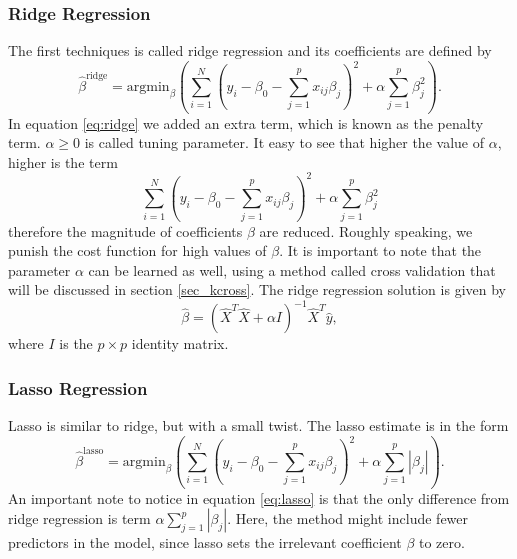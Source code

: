 \documentclass [11pt]{article}
\begin{document}
\subsubsection*{Ridge Regression}
The first techniques is called ridge regression and its coefficients are defined by 
\begin{equation}
\hat{\beta}^{\text{ridge}}=\text{argmin}_{\beta} ( \sum_{i=1}^{N}(y_{i}- \beta_{0}- \sum_{j=1}^{p}x_{ij}\beta_{j})^{2}+ \alpha \sum_{j=1}^{p} \beta_{j}^{2}).
\label{eq:ridge}
\end{equation}
In equation \eqref{eq:ridge} we added an extra term, which is known as the penalty term. $\alpha \geq 0$ is called tuning parameter. It easy to see that higher the value of $\alpha$, higher is the term 
\begin{equation*}
\sum_{i=1}^{N}(y_{i}- \beta_{0}- \sum_{j=1}^{p}x_{ij}\beta_{j})^{2}+ \alpha \sum_{j=1}^{p} \beta_{j}^{2}
\end{equation*}
therefore the magnitude of coefficients $\beta$ are reduced. Roughly speaking, we punish the cost function for high values of $\beta$. It is important to note that the parameter $\alpha$ can be learned as well, using a method called cross validation that will be discussed in section \ref{sec_kcross}.
The ridge regression solution is given by
\begin{equation}
\hat{\beta} =\left(\hat{X}^T\hat{X} + \alpha I \right)^{-1}\hat{X}^T\hat{y},
\end{equation}
where $I$ is the $p \times p$ identity matrix.
\subsubsection*{Lasso Regression}
Lasso is similar to ridge, but with a small twist. The lasso estimate is in the form
\begin{equation}
\hat{\beta}^{\text{lasso}}=\text{argmin}_{\beta} ( \sum_{i=1}^{N}(y_{i}- \beta_{0}- \sum_{j=1}^{p}x_{ij}\beta_{j})^{2}+ \alpha \sum_{j=1}^{p} |\beta_{j}|).
\label{eq:lasso}
\end{equation}
An important note to notice in equation \eqref{eq:lasso} is that the only difference from ridge regression is term $\alpha \sum_{j=1}^{p} |\beta_{j}|$. Here, the method might include fewer predictors in the model, since lasso sets the irrelevant coefficient $\beta$ to zero.
\end{document}
